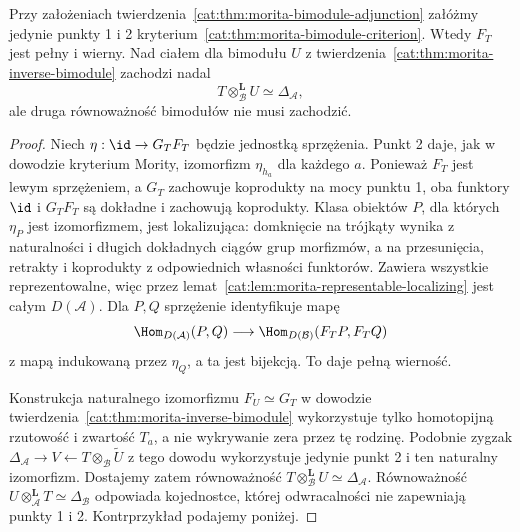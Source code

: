 \begin{stwierdzenie}\label{cat:prop:morita-fully-faithful}
Przy założeniach twierdzenia~\ref{cat:thm:morita-bimodule-adjunction} załóżmy jedynie punkty 1 i 2 kryterium~\ref{cat:thm:morita-bimodule-criterion}. Wtedy $F_T$ jest pełny i wierny. Nad ciałem dla bimodułu $U$ z twierdzenia~\ref{cat:thm:morita-inverse-bimodule} zachodzi nadal
\[
 T\otimes_{\mathcal B}^{\mathbf L}U\simeq\Delta_{\mathcal A},
\]
ale druga równoważność bimodułów nie musi zachodzić.
\end{stwierdzenie}
\begin{proof}
Niech $\eta:\id\to G_TF_T$ będzie jednostką sprzężenia. Punkt 2 daje, jak w dowodzie kryterium Mority, izomorfizm $\eta_{h_a}$ dla każdego $a$. Ponieważ $F_T$ jest lewym sprzężeniem, a $G_T$ zachowuje koprodukty na mocy punktu 1, oba funktory $\id$ i $G_TF_T$ są dokładne i zachowują koprodukty. Klasa obiektów $P$, dla których $\eta_P$ jest izomorfizmem, jest lokalizująca: domknięcie na trójkąty wynika z naturalności i długich dokładnych ciągów grup morfizmów, a na przesunięcia, retrakty i koprodukty z odpowiednich własności funktorów. Zawiera wszystkie reprezentowalne, więc przez lemat~\ref{cat:lem:morita-representable-localizing} jest całym $D(\mathcal A)$. Dla $P,Q$ sprzężenie identyfikuje mapę
\[
 \Hom_{D(\mathcal A)}(P,Q)\longrightarrow
 \Hom_{D(\mathcal B)}(F_TP,F_TQ)
\]
z mapą indukowaną przez $\eta_Q$, a ta jest bijekcją. To daje pełną wierność.

Konstrukcja naturalnego izomorfizmu $F_U\simeq G_T$ w dowodzie twierdzenia~\ref{cat:thm:morita-inverse-bimodule} wykorzystuje tylko homotopijną rzutowość i zwartość $T_a$, a nie wykrywanie zera przez tę rodzinę. Podobnie zygzak $\Delta_{\mathcal A}\to V\leftarrow T\otimes_{\mathcal B}\widetilde U$ z tego dowodu wykorzystuje jedynie punkt 2 i ten naturalny izomorfizm. Dostajemy zatem równoważność $T\otimes_{\mathcal B}^{\mathbf L}U\simeq\Delta_{\mathcal A}$. Równoważność $U\otimes_{\mathcal A}^{\mathbf L}T\simeq\Delta_{\mathcal B}$ odpowiada kojednostce, której odwracalności nie zapewniają punkty 1 i 2. Kontrprzykład podajemy poniżej.
\end{proof}

